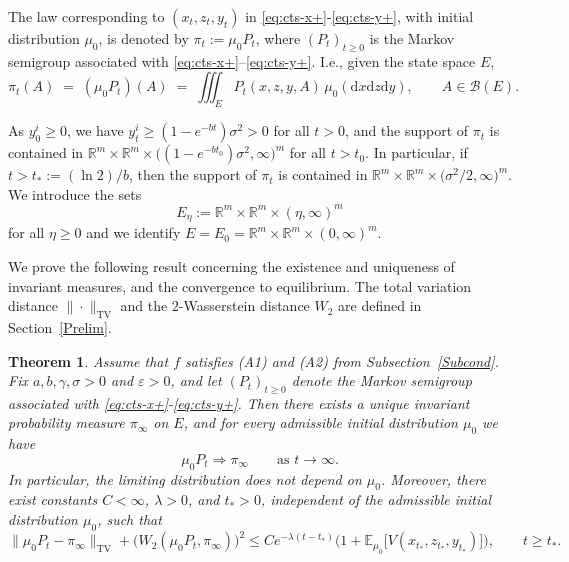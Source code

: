 \documentclass[11pt, a4paper,leqno]{amsart}
\newtheorem{theorem}{Theorem}[section]
\theoremstyle{definition}
\numberwithin{equation}{section}
\newcommand{\R}{\mathbb R}
\begin{document}
The law corresponding to $(x_t,z_t,y_t)$ in \eqref{eq:cts-x+}-\eqref{eq:cts-y+}, with initial distribution $\mu_0$, is
denoted by $\pi_t := \mu_0 P_t$, where $(P_t)_{t\ge0}$ is the Markov semigroup associated with
\eqref{eq:cts-x+}–\eqref{eq:cts-y+}. I.e.,  given the state space
$E$,
\begin{equation}\label{eq:pi_t_def}
\pi_t(A)
\;=\;
(\mu_0 P_t)(A)
\;=\;
\iiint_E P_t(x,z,y,A)\,\mu_0(\mathrm d x\mathrm d z\mathrm d y),
\qquad
A\in\mathcal B(E).
\end{equation}

As $y_0^i\ge 0$, we have $y_t^i\ge (1-e^{-bt})\sigma^2>0$ for all $t>0$, and the support of $\pi_t$ is contained in
$\R^m\times \R^m\times \bigl((1-e^{-bt_0})\sigma^2,\infty\bigr)^m$ for all $t> t_0$. In particular, if $t> t_\ast:=(\ln 2)/b$, then the support of $\pi_t$ is contained in
$\R^m\times \R^m\times \bigl(\sigma^2/2,\infty\bigr)^m$. We introduce the sets
\begin{equation}\label{intimeasurell}
E_{\eta}:=\R^m\times\R^m\times(\eta,\infty)^m
\end{equation}
for all $\eta\geq 0$ and we identify $E=E_0=\R^m\times\R^m\times(0,\infty)^m$.





We prove the following result concerning the existence and uniqueness of invariant measures, and the  convergence to equilibrium.  The total variation distance $\|\cdot\|_{\mathrm{TV}}$
and the $2$-Wasserstein distance $W_2$ are defined in
Section~\ref{Prelim}.

\begin{theorem}\label{CorC}
Assume that $f$ satisfies \textnormal{(A1)} and \textnormal{(A2)} from Subsection~\ref{Subcond}. Fix $a,b,\gamma,\sigma>0$ and $\varepsilon>0$,
and let $(P_t)_{t\ge0}$ denote the Markov semigroup associated with
\eqref{eq:cts-x+}-\eqref{eq:cts-y+}. Then there exists a unique invariant probability measure $\pi_\infty$ on $E$, and for every admissible initial distribution $\mu_0$ we have
\[
\mu_0 P_t \Rightarrow \pi_\infty
\qquad \text{as } t\to\infty .
\]
In particular, the limiting distribution does not depend on $\mu_0$. Moreover, there exist constants $C<\infty$, $\lambda>0$, and $t_\ast>0$,
independent of the admissible initial distribution $\mu_0$, such that
\begin{equation}\label{eq:V-geometric-ergodicity-revisedapa}
\|\mu_0P_t-\pi_\infty\|_{\mathrm{TV}}+\bigl (W_2(\mu_0P_t,\pi_\infty)\bigr)^2
\le
C e^{-\lambda (t-t_\ast)}
\bigl(1+\mathbb{E}_{\mu_0}\!\big[V(x_{t_\ast},z_{t_\ast},y_{t_\ast})\big]\bigr),
\qquad t\ge t_\ast.
\end{equation}
\end{theorem}
\end{document}

